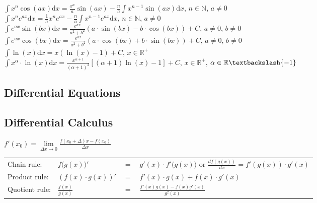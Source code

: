 	$\int x^n \cos(ax) \mathrm dx = \frac{x^n}{a} \sin(ax) - \frac{n}{a} \int
	x^{n-1} \sin(ax) \mathrm dx$, $n \in \mathbb N$, $a \neq 0$\\
	$\int x^n e^{ax} \mathrm dx = \frac{1}{a} x^n e^{ax} - \frac{n}{a} \int
	x^{n-1} e^{ax} \mathrm dx$, $n \in \mathbb N$, $a \neq 0$\\
	$\int e^{ax} \sin(bx) \mathrm dx = \frac{e^{ax}}{a^2 + b^2} (a \cdot \sin(bx) -
	b \cdot \cos(bx)) + C$, $a \neq 0$, $b \neq 0$ \\
	$\int e^{ax} \cos(bx) \mathrm dx = \frac{e^{ax}}{a^2 + b^2} (a \cdot \cos(bx) +
	b \cdot \sin(bx)) + C$, $a \neq 0$, $b \neq 0$ \\
	$\int \ln(x) \mathrm dx = x(\ln(x) - 1) + C$, $x \in \mathbb R^+$\\
	$\int x^\alpha \cdot \ln(x) \mathrm dx = \frac{x^{\alpha + 1}}{(\alpha + 1)^2}
	[(\alpha + 1) \ln(x) - 1] + C$, $x \in \mathbb R^+$, $\alpha \in \mathbb R
	\textbackslash \{-1\}$\\


	\subsection{Differential Equations}
		
	\subsection{Differential Calculus}
	  $f'(x_0)=\lim\limits_{\Delta x\rightarrow 0}
	  \frac{f(x_0+\Delta)x-f(x_0)}{\Delta x}$\\
		\begin{tabular}{llll}
			Chain rule:	& $f\big(g(x)\big)'$ &$=$ & $g'(x)\cdot f'\big(g(x)\big)$
			or $\frac{d f(g(x))}{dx} = f'(g(x)) \cdot g'(x)$\\[0.1cm] Product rule:	&
			$\left(f(x)\cdot g(x)\right)'$ &$=$ & $f'(x)\cdot g(x) + f(x)\cdot g'(x)$\\
			[0.1cm] Quotient rule:& $\frac{f(x)}{g(x)}$ &$=$ & $\frac{f'(x)g(x)-f(x)g'(x)}{g^2(x)}$\\
		\end{tabular}

